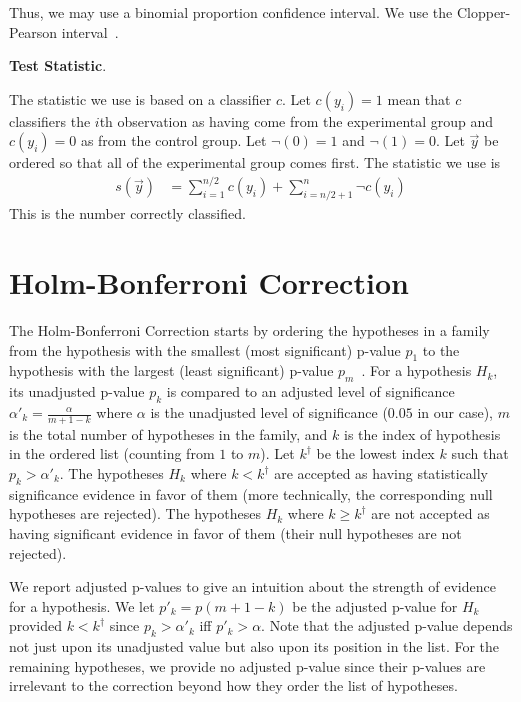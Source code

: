 \documentclass{article}
\makeatletter
\newcommand\gobblepars{\@ifnextchar\par {\expandafter\gobblepars\@gobble}{}}
\renewcommand{\paragraph}[1]{\smallskip\noindent\textbf{#1}.\ \ \gobblepars}
\makeatother
\begin{document}
Thus, we may use a binomial proportion confidence interval.  
We use the Clopper-Pearson interval~\cite{clopper34biometrika}.







\paragraph{Test Statistic}
The statistic we use is based on a classifier $c$.  
Let $c(y_i) = 1$ mean that $c$ classifiers the $i$th observation as having come from the experimental group and $c(y_i) = 0$ as from the control group.  Let $\neg(0) = 1$ and $\neg(1) = 0$.  Let $\vec{y}$ be ordered so that all of the experimental group comes first.
The statistic we use is
\begin{align}
s(\vec{y}) &= \sum_{i = 1}^{n/2} c(y_i) + \sum_{i = n/2 + 1}^{n} \neg c(y_i)
\end{align}
This is the number correctly classified.












\section{Holm-Bonferroni Correction}
\label{app:correction}

The Holm-Bonferroni Correction starts by ordering the hypotheses in a family from the hypothesis with the smallest (most significant) p-value $p_1$ to the hypothesis with the largest (least significant) p-value $p_m$~\cite{holm79scandinavian}.
For a hypothesis $H_k$, its unadjusted p-value $p_k$ is compared to an adjusted level of significance $\alpha'_k = \frac{\alpha}{m + 1 - k}$ 
where $\alpha$ is the unadjusted level of significance ($0.05$ in our case), $m$ is the total number of hypotheses in the family, and $k$ is the index of hypothesis in the ordered list (counting from $1$ to $m$).
Let $k^\dagger$ be the lowest index $k$ such that $p_k > \alpha'_k$.
The hypotheses $H_k$ where $k < k^\dagger$ are accepted as having statistically significance evidence in favor of them (more technically, the corresponding null hypotheses are rejected).
The hypotheses $H_k$ where $k \geq k^\dagger$ are not accepted as having significant evidence in favor of them (their null hypotheses are not rejected).

We report adjusted p-values to give an intuition about the strength of evidence for a hypothesis.
We let $p'_k = p (m + 1 - k)$ be the adjusted p-value for $H_k$ provided $k < k^\dagger$ since $p_k > \alpha'_k$ iff $p'_k > \alpha$.
Note that the adjusted p-value depends not just upon its unadjusted value but also upon its position in the list.
For the remaining hypotheses, we provide no adjusted p-value since their p-values are irrelevant to the correction beyond how they order the list of hypotheses.
\end{document}
